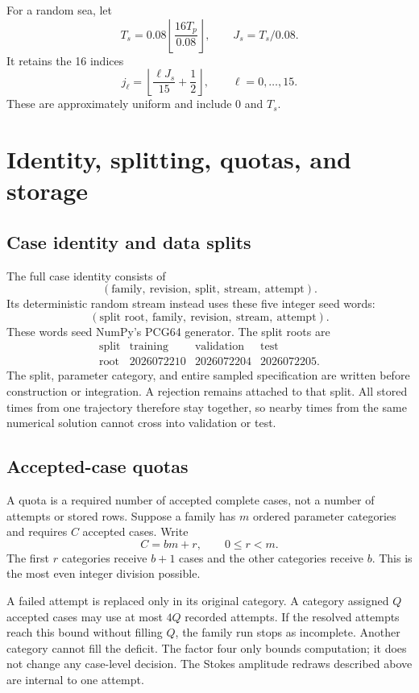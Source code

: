 \documentclass[10pt]{article}
\begin{document}
For a random sea, let
\[
  T_s=0.08\left\lfloor\frac{16T_p}{0.08}\right\rfloor,
  \qquad J_s=T_s/0.08.
\]
It retains the 16 indices
\[
  j_\ell=
  \left\lfloor\frac{\ell J_s}{15}+\frac12\right\rfloor,
  \qquad \ell=0,\ldots,15.
\]
These are approximately uniform and include $0$ and $T_s$.

\section{Identity, splitting, quotas, and storage}
\label{sec:records}

\subsection{Case identity and data splits}

The full case identity consists of
\[
  (\text{family},\ \text{revision},\ \text{split},\
    \text{stream},\ \text{attempt}).
\]
Its deterministic random stream instead uses these five integer seed words:
\[
  (\text{split root},\ \text{family},\ \text{revision},\
    \text{stream},\ \text{attempt}).
\]
These words seed NumPy's PCG64 generator.  The split roots are
\[
  \begin{array}{c|ccc}
    \text{split}&\text{training}&\text{validation}&\text{test}\\ \hline
    \text{root}&2026072210&2026072204&2026072205.
  \end{array}
\]
The split, parameter category, and entire sampled specification are written
before construction or integration.  A rejection remains attached to that
split.  All stored times from one trajectory therefore stay together, so
nearby times from the same numerical solution cannot cross into validation
or test.

\subsection{Accepted-case quotas}

A quota is a required number of accepted complete cases, not a number of
attempts or stored rows.  Suppose a family has $m$ ordered parameter
categories and requires $C$ accepted cases.  Write
\[
  C=bm+r,\qquad 0\leq r<m.
\]
The first $r$ categories receive $b+1$ cases and the other categories receive $b$.
This is the most even integer division possible.

A failed attempt is replaced only in its original category.  A category assigned
$Q$ accepted cases may use at most $4Q$ recorded attempts.  If the
resolved attempts reach this bound without filling $Q$, the family run stops
as incomplete.  Another category cannot fill the deficit.  The factor four
only bounds computation; it does not change any case-level decision.  The
Stokes amplitude redraws described above are internal to one attempt.
\end{document}
